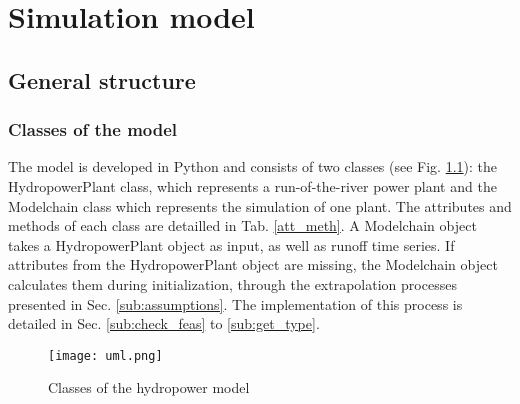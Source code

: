 \chapter{Simulation model}
\label{chap:simulation_model}

\section{General structure}

\subsection{Classes of the model}
The model is developed in Python and consists of two classes (see Fig. \ref{uml}): the HydropowerPlant class, which represents a run-of-the-river power plant and the Modelchain class which represents the simulation of one plant. The attributes and methods of each class are detailled in Tab. \ref{att_meth}. \newline
A Modelchain object takes a HydropowerPlant object as input, as well as runoff time series. If attributes from the HydropowerPlant object are missing, the Modelchain object calculates them during initialization, through the extrapolation processes presented in Sec. \ref{sub:assumptions}. The implementation of this process is detailed in Sec. \ref{sub:check_feas} to \ref{sub:get_type}.
\begin{figure}[H]
\centering
\texttt{[image: uml.png]}
\caption{Classes of the hydropower model}
\label{uml}
\end{figure}

